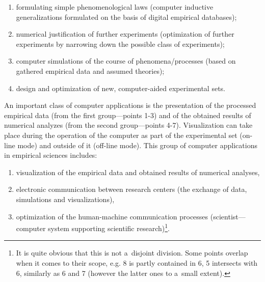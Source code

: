 \setcounter{saveenum}{\value{enumi}}

\begin{enumerate}

\setcounter{enumi}{\value{saveenum}}

\item formulating simple phenomenological laws (computer inductive generalizations formulated on the basis of digital empirical databases);

\item numerical justification of further experiments (optimization of further experiments by narrowing down the possible class of experiments);

\item computer simulations of the course of phenomena/processes (based on gathered empirical data and assumed theories);

\item design and optimization of new, computer-aided experimental sets.

\end{enumerate}

An important class of computer applications is the presentation of the processed empirical data (from the first group---points 1-3) and of the obtained results of numerical analyzes (from the second group---points 4-7). Visualization can take place during the operation of the computer as part of the experimental set (on-line mode) and outside of it (off-line mode). This group of computer applications in empirical sciences includes:



\setcounter{saveenum}{\value{enumi}}

\begin{enumerate}

\setcounter{enumi}{\value{saveenum}}

\item visualization of the empirical data and obtained results of numerical analyses,

\item electronic communication between research centers (the exchange of data, simulations and visualizations),

\item optimization of the human-machine communication processes (scientist---computer system supporting scientific research)\footnote{It is quite obvious that this is not a~disjoint division. Some points overlap when it comes to their scope, e.g. 8 is partly contained in 6, 5 intersects with 6, similarly as 6 and 7 (however the latter ones to a~small extent).}.

\end{enumerate}

